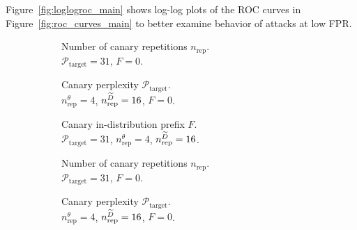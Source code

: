 Figure~\ref{fig:loglogroc_main} shows log-log plots of the ROC curves in Figure~\ref{fig:roc_curves_main} to better examine behavior of attacks at low FPR.

\begin{figure*}[htb]
  \centering
  \begin{subfigure}{0.32\textwidth}
    \centering
    \resizebox{\textwidth}{!}{}
    \caption{
        Number of canary repetitions $n_\textrm{rep}$. \\
        $\mathcal{P}_\textrm{target} = 31$, $F=0$.
    }
    \label{subfig:loglogrepetitions_sst2}
  \end{subfigure}
  \begin{subfigure}{0.32\textwidth}
    \centering
    \resizebox{\textwidth}{!}{}
    \caption{
        Canary perplexity $\mathcal{P}_\textrm{target}$. \\
        $n_\textrm{rep}^{\theta}=4$, $n_\textrm{rep}^{{\widetilde{D}}}=16$, $F=0$.
    }
    \label{subfig:loglogperplexity_sst2}
  \end{subfigure}
  \begin{subfigure}{0.32\textwidth}
    \centering
    \resizebox{\textwidth}{!}{}
    \caption{
        Canary in-distribution prefix $F$. \\
        $\mathcal{P}_\textrm{target}=31$, $n_\textrm{rep}^{\theta}=4$, $n_\textrm{rep}^{{\widetilde{D}}}=16$.
    }
    \label{subfig:loglogprefix_sst2}
  \end{subfigure}
  \begin{subfigure}{0.32\textwidth}
    \centering
    \resizebox{\textwidth}{!}{}
    \caption{
        Number of canary repetitions $n_\textrm{rep}$. \\
        $\mathcal{P}_\textrm{target} = 31$, $F=0$.
    }
    \label{subfig:loglogrepetitions_agnews}
  \end{subfigure}
  \begin{subfigure}{0.32\textwidth}
    \centering
    \resizebox{\textwidth}{!}{}
    \caption{
        Canary perplexity $\mathcal{P}_\textrm{target}$. \\
        $n_\textrm{rep}^{\theta}=4$, $n_\textrm{rep}^{{\widetilde{D}}}=16$, $F=0$.
    }
    \label{subfig:loglogperplexity_agnews}
  \end{subfigure}
  \begin{subfigure}{0.32\textwidth}

\end{subfigure}
\end{figure*}
